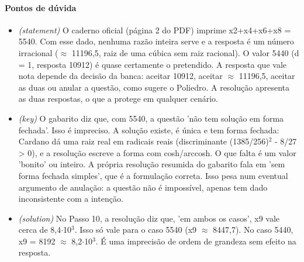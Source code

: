 \documentclass{article}%
\begin{document}
\paragraph{Pontos de dúvida}%
\begin{itemize}%
\item%
\textit{(statement)} O caderno oficial (página 2 do PDF) imprime x2+x4+x6+x8 = 5540. Com esse dado, nenhuma razão inteira serve e a resposta é um número irracional ($\approx$ 11196,5, raiz de uma cúbica sem raiz racional). O valor 5440 (d = 1, resposta 10912) é quase certamente o pretendido. A resposta que vale nota depende da decisão da banca: aceitar 10912, aceitar $\approx$ 11196,5, aceitar as duas ou anular a questão, como sugere o Poliedro. A resolução apresenta as duas respostas, o que a protege em qualquer cenário.%
\item%
\textit{(key)} O gabarito diz que, com 5540, a questão 'não tem solução em forma fechada'. Isso é impreciso. A solução existe, é única e tem forma fechada: Cardano dá uma raiz real em radicais reais (discriminante (1385/256)$^2$ - 8/27 > 0), e a resolução escreve a forma com cosh/arccosh. O que falta é um valor 'bonito' ou inteiro. A própria resolução resumida do gabarito fala em 'sem forma fechada simples', que é a formulação correta. Isso pesa num eventual argumento de anulação: a questão não é impossível, apenas tem dado inconsistente com a intenção.%
\item%
\textit{(solution)} No Passo 10, a resolução diz que, 'em ambos os casos', x9 vale cerca de 8,4$\cdot$10$^3$. Isso só vale para o caso 5540 (x9 $\approx$ 8447,7). No caso 5440, x9 = 8192 $\approx$ 8,2$\cdot$10$^3$. É uma imprecisão de ordem de grandeza sem efeito na resposta.%
\end{itemize}%
\end{document}
